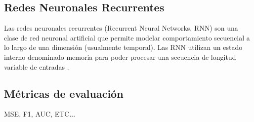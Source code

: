 \subsection{Redes Neuronales Recurrentes}

Las redes neuronales recurrentes (Recurrent Neural Networks, RNN) son una clase 
de red neuronal artificial que permite modelar comportamiento secuencial a lo 
largo de una dimensión (usualmente temporal). Las RNN utilizan un estado interno 
denominado memoria para poder procesar una secuencia de longitud variable de 
entradas \cite{Abiodun2018}.



\subsection{Métricas de evaluación}

MSE, F1, AUC, ETC...
